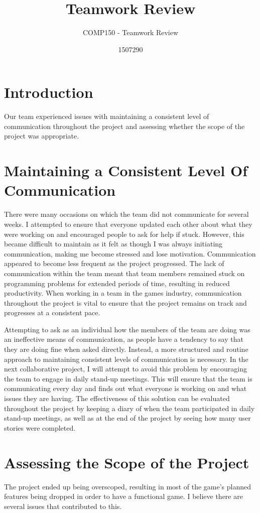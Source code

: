 \documentclass{scrartcl}
\title{Teamwork Review}
\subtitle{COMP150 - Teamwork Review}
\author{1507290}
\begin{document}
\maketitle

\abstract{}

\section{Introduction}
Our team experienced issues with maintaining a consistent level of communication throughout the project and assessing whether the scope of the project was appropriate.

\section{Maintaining a Consistent Level Of Communication}
There were many occasions on which the team did not communicate for several weeks. I attempted to ensure that everyone updated each other about what they were working on and encouraged people to ask for help if stuck. However, this became difficult to maintain as it felt as though I was always initiating communication, making me become stressed and lose motivation. Communication appeared to become less frequent as the project progressed. The lack of communication within the team meant that team members remained stuck on programming problems for extended periods of time, resulting in reduced productivity. When working in a team in the games industry, communication throughout the project is vital to ensure that the project remains on track and progresses at a consistent pace.

Attempting to ask as an individual how the members of the team are doing was an ineffective means of communication, as people have a tendency to say that they are doing fine when asked directly. Instead, a more structured and routine approach to maintaining consistent levels of communication is necessary. In the next collaborative project, I will attempt to avoid this problem by encouraging the team to engage in daily stand-up meetings. This will ensure that the team is communicating every day and finds out what everyone is working on and what issues they are having. The effectiveness of this solution can be evaluated throughout the project by keeping a diary of when the team participated in daily stand-up meetings, as well as at the end of the project by seeing how many user stories were completed.

\section{Assessing the Scope of the Project}
The project ended up being overscoped, resulting in most of the game's planned features being dropped in order to have a functional game. I believe there are several issues that contributed to this. 
\end{document}

